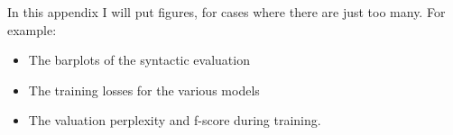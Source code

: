 In this appendix I will put figures, for cases where there are just too many. For example:
\begin{itemize}
  \item The barplots of the syntactic evaluation
  \item The training losses for the various models
  \item The valuation perplexity and f-score during training.
\end{itemize}
